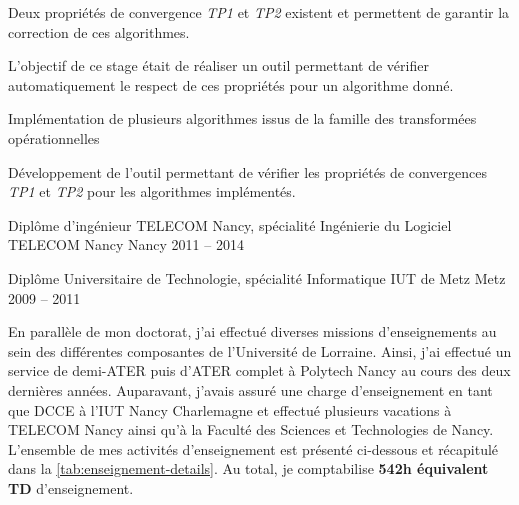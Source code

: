 \documentclass[12pt, a4paper]{awesome-cv}
\begin{document}
\begin{cventries}
\begin{cvparagraph}
  Deux propriétés de convergence \emph{TP1} et \emph{TP2} existent et permettent de garantir la correction de ces algorithmes.

  L'objectif de ce stage était de réaliser un outil permettant de vérifier automatiquement le respect de ces propriétés pour un algorithme donné.
  \begin{tightemize}
    \item Implémentation de plusieurs algorithmes issus de la famille des transformées opérationnelles
    \item Développement de l'outil permettant de vérifier les propriétés de convergences \emph{TP1} et \emph{TP2} pour les algorithmes implémentés.
  \end{tightemize}
\end{cvparagraph}

\end{cventries}

\pagebreak


\begin{cventries}

\cventry
    {Diplôme d'ingénieur TELECOM Nancy, spécialité Ingénierie du Logiciel} %
    {TELECOM Nancy} %
    {Nancy} %
    {2011 – 2014} %
    {}

\cventry
  {Diplôme Universitaire de Technologie, spécialité Informatique} %
  {IUT de Metz} %
  {Metz} %
  {2009 – 2011} %
  {}
\end{cventries}



\begin{cvparagraph}
  En parallèle de mon doctorat, j'ai effectué diverses missions d'enseignements au sein des différentes composantes de l'Université de Lorraine.
  Ainsi, j'ai effectué un service de demi-ATER puis d'ATER complet à Polytech Nancy au cours des deux dernières années.
  Auparavant, j'avais assuré une charge d'enseignement en tant que DCCE à l'IUT Nancy Charlemagne et effectué plusieurs vacations à TELECOM Nancy ainsi qu'à la Faculté des Sciences et Technologies de Nancy.
  L'ensemble de mes activités d'enseignement est présenté ci-dessous et récapitulé dans la \autoref{tab:enseignement-details}.
  Au total, je comptabilise \textbf{542h équivalent TD} d'enseignement.
\end{cvparagraph}
\end{document}
